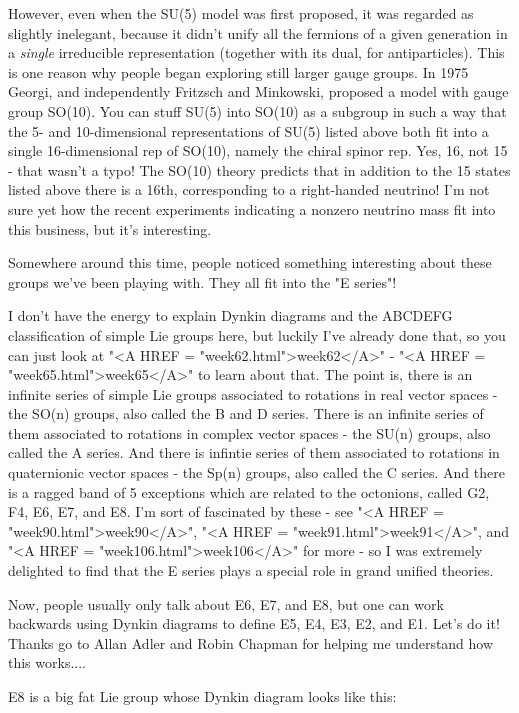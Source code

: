 However, even when the SU(5) model was first proposed, it was regarded
as slightly inelegant, because it didn't unify all the fermions of a
given generation in a \emph{single} irreducible representation (together
with its dual, for antiparticles).  This is one reason why people
began exploring still larger gauge groups.  In 1975 Georgi, and
independently Fritzsch and Minkowski, proposed a model with gauge
group SO(10).  You can stuff SU(5) into SO(10) as a subgroup in such a
way that the 5- and 10-dimensional representations of SU(5) listed
above both fit into a single 16-dimensional rep of SO(10), namely the
chiral spinor rep.  Yes, 16, not 15 - that wasn't a typo!  The SO(10)
theory predicts that in addition to the 15 states listed above there
is a 16th, corresponding to a right-handed neutrino!  I'm not sure yet
how the recent experiments indicating a nonzero neutrino mass fit into
this business, but it's interesting.  

Somewhere around this time, people noticed something interesting about
these groups we've been playing with.  They all fit into the "E series"!

I don't have the energy to explain Dynkin diagrams and the ABCDEFG
classification of simple Lie groups here, but luckily I've already
done that, so you can just look at "<A HREF = "week62.html">week62</A>" - "<A HREF = "week65.html">week65</A>" to learn about
that.  The point is, there is an infinite series of simple Lie groups
associated to rotations in real vector spaces - the SO(n) groups, also
called the B and D series.  There is an infinite series of them
associated to rotations in complex vector spaces - the SU(n) groups,
also called the A series.  And there is infintie series of them
associated to rotations in quaternionic vector spaces - the Sp(n)
groups, also called the C series.  And there is a ragged band of 5
exceptions which are related to the octonions, called G2, F4, E6, E7,
and E8.  I'm sort of fascinated by these - see "<A HREF = "week90.html">week90</A>", "<A HREF = "week91.html">week91</A>", and
"<A HREF = "week106.html">week106</A>" for more - so I was extremely delighted to find that the E
series plays a special role in grand unified theories.

Now, people usually only talk about E6, E7, and E8, but one can work
backwards using Dynkin diagrams to define E5, E4, E3, E2, and E1.
Let's do it!  Thanks go to Allan Adler and Robin Chapman for helping
me understand how this works....

E8 is a big fat Lie group whose Dynkin diagram looks like this:

